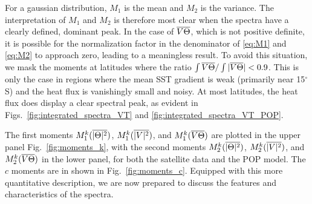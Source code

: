 \documentclass[10pt]{article}
\newcommand{\ol}{\ensuremath{\overline}}
\begin{document}
For a gaussian distribution, $M_1$ is the mean and $M_2$ is the variance. The interpretation of $M_1$ and $M_2$ is therefore most clear when the spectra have a clearly defined, dominant peak. In the case of $\ol{V \Theta}$,  which is not positive definite, it is possible for the normalization factor in the denominator of \eqref{eq:M1} and \eqref{eq:M2} to approach zero, leading to a meaningless result. To avoid this situation, we mask the moments at latitudes where the ratio $\int \ol{V\Theta} / \int | \ol{V \Theta} | < 0.9$. This is only the case in regions where the mean SST gradient is weak (primarily near 15$^\circ$S) and the heat flux is vanishingly small and noisy. At most latitudes, the heat flux does display a clear spectral peak, as evident in Figs.~\ref{fig:integrated_spectra_VT} and \ref{fig:integrated_spectra_VT_POP}.

The first moments $M_1^k( \ol{|\Theta|^2} )$, $M_1^k( \ol{|V|^2} )$, and $M_1^k( \ol{V \Theta} )$ are plotted in the upper panel Fig.~\ref{fig:moments_k}, with the second moments $M_2^k( \ol{|\Theta|^2} )$, $M_2^k( \ol{|V|^2} )$, and $M_2^k( \ol{V \Theta} )$ in the lower panel, for both the satellite data and the POP model. The $c$ moments are in shown in Fig.~\ref{fig:moments_c}. Equipped with this more quantitative description, we are now prepared to discuss the features and characteristics of the spectra.
\end{document}
